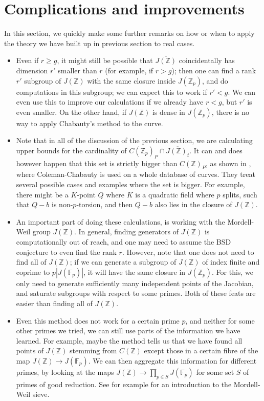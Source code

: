 \documentclass[12pt]{article}
\newcommand{\Z}{\mathbb{Z}}
\newcommand{\F}{\mathbb{F}}
\theoremstyle{plain}
\theoremstyle{definition}
\theoremstyle{remark}
\begin{document}
\section{Complications and improvements}
\label{section:remarks} 
In this section, we quickly make some further remarks on how or when to apply the theory we have built up in previous section to real cases.
\begin{itemize} 
\item Even if $r \geq g$, it might still be possible that $\overline{J(\Z)}$ coincidentally has dimension $r'$ smaller than $r$ (for example, if $r > g$); then one can find a rank $r'$ subgroup of $J(\Z)$ with the same closure inside $J(\Z_p)$, and do computations in this subgroup; we can expect this to work if $r' < g$. We can even use this to improve our calculations if we already have $r < g$, but $r'$ is even smaller. On the other hand, if $J(\Z)$ is dense in $J(\Z_p)$, there is no way to apply Chabauty's method to the curve.
\item Note that in all of the discussion of the previous section, we are calculating upper bounds for the cardinality of $C(\Z_p)_P \cap \overline{J(\Z)_t}$. It can and does however happen that this set is strictly bigger than $C(\Z)_P$, as shown in \citep{Balakrishnan19}, where Coleman-Chabauty is used on a whole database of curves. They treat several possible cases and examples where the set is bigger. For example, there might be a $K$-point $Q$ where $K$ is a quadratic field where $p$ splits, such that $Q-b$ is non-$p$-torsion, and then $Q-b$ also lies in the closure of $J(\Z)$.
\item An important part of doing these calculations, is working with the Mordell-Weil group $J(\Z)$. In general, finding generators of $J(\Z)$ is computationally out of reach, and one may need to assume the BSD conjecture to even find the rank $r$. However, note that one does not need to find all of $J(\Z)$; if we can generate a subgroup of $J(\Z)$ of index finite and coprime to $p|J(\F_p)|$, it will have the same closure in $J(\Z_p)$. For this, we only need to generate sufficiently many independent points of the Jacobian, and saturate subgroups with respect to some primes. Both of these feats are easier than finding all of $J(\Z)$.
\item Even this method does not work for a certain prime $p$, and neither for some other primes we tried, we can still use parts of the information we have learned. For example, maybe the method tells us that we have found all points of $J(\Z)$ stemming from $C(\Z)$ except those in a certain fibre of the map $J(\Z) \to J(\F_p)$. We can then aggregate this information for different primes, by looking at the maps $J(\Z) \to \prod_{p \in S} J(\F_p)$ for some set $S$ of primes of good reduction. See for example \citep{stoll10} for an introduction to the Mordell-Weil sieve.
\end{itemize}
\end{document}
